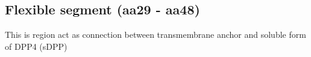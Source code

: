 \subsection{Flexible segment (aa29 - aa48)}

This is region act as connection between transmembrane anchor and soluble form of DPP4 (sDPP)
